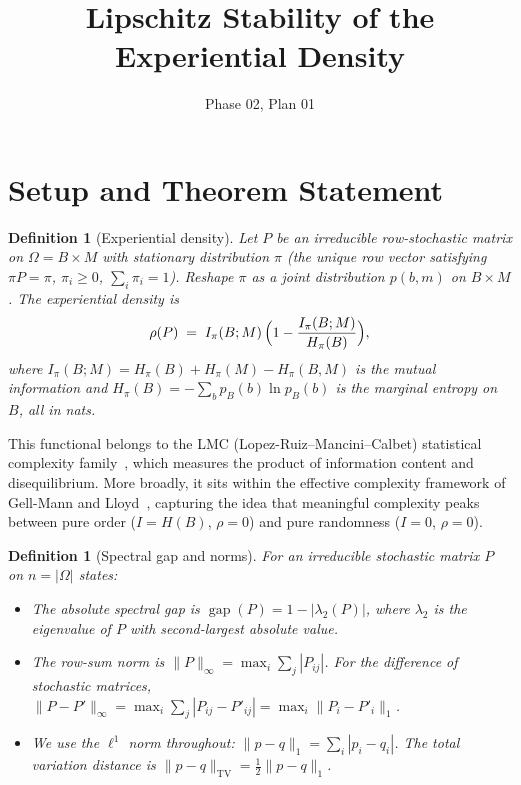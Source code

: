 \documentclass[11pt]{article}
\title{Lipschitz Stability of the Experiential Density}
\author{Phase 02, Plan 01}
\date{}
\newtheorem{definition}[theorem]{Definition}
\DeclareMathOperator{\gap}{gap}
\begin{document}
\maketitle

\section{Setup and Theorem Statement}

\begin{definition}[Experiential density]
Let $P$ be an irreducible row-stochastic matrix on $\Omega = B \times M$
with stationary distribution $\pi$ (the unique row vector satisfying
$\pi P = \pi$, $\pi_i \ge 0$, $\sum_i \pi_i = 1$).
Reshape $\pi$ as a joint distribution $p(b,m)$ on $B \times M$.
The \emph{experiential density} is
\begin{equation}\label{eq:rho-def}
  \rho(P) \;=\; I_\pi(B;M)\,\Bigl(1 - \frac{I_\pi(B;M)}{H_\pi(B)}\Bigr),
\end{equation}
where $I_\pi(B;M) = H_\pi(B) + H_\pi(M) - H_\pi(B,M)$ is the mutual
information and $H_\pi(B) = -\sum_b p_B(b)\ln p_B(b)$ is the marginal
entropy on $B$, all in nats.
\end{definition}

This functional belongs to the LMC (Lopez-Ruiz--Mancini--Calbet) statistical
complexity family~\cite{LMC1995}, which measures the product of information
content and disequilibrium.  More broadly, it sits within the effective
complexity framework of Gell-Mann and Lloyd~\cite{GellMannLloyd2003},
capturing the idea that meaningful complexity peaks between pure order
($I = H(B)$, $\rho = 0$) and pure randomness ($I = 0$, $\rho = 0$).

\begin{definition}[Spectral gap and norms]
For an irreducible stochastic matrix $P$ on $n = |\Omega|$ states:
\begin{itemize}
  \item The \emph{absolute spectral gap} is
        $\gap(P) = 1 - |\lambda_2(P)|$, where $\lambda_2$ is the
        eigenvalue of $P$ with second-largest absolute value.
  \item The \emph{row-sum norm} is
        $\|P\|_\infty = \max_i \sum_j |P_{ij}|$.
        For the difference of stochastic matrices,
        $\|P - P'\|_\infty = \max_i \sum_j |P_{ij} - P'_{ij}|
        = \max_i \|P_i - P'_i\|_1$.
  \item We use the $\ell^1$ norm throughout:
        $\|p - q\|_1 = \sum_i |p_i - q_i|$.
        The total variation distance is
        $\|p-q\|_{\mathrm{TV}} = \tfrac{1}{2}\|p-q\|_1$.
\end{itemize}
\end{definition}
\end{document}
